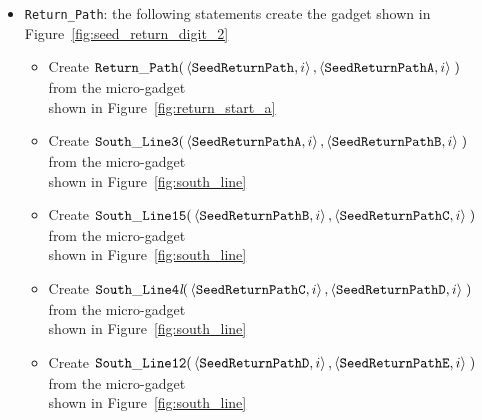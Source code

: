 \begin{itemize}
    \item {\tt Return\_Path}: the following statements create the gadget shown in Figure~\ref{fig:seed_return_digit_2}
    \begin{itemize}
        \item Create
        $\begin{aligned}[t]
            {\tt Return\_Path}(&\left\langle {\tt SeedReturnPath},  i \right\rangle,
                                \left\langle {\tt SeedReturnPathA}, i \right\rangle \;)
        \end{aligned}$ from the micro-gadget\\shown in Figure~\ref{fig:return_start_a}

        \item Create
        $\begin{aligned}[t]
            {\tt South\_Line3}(&\left\langle {\tt SeedReturnPathA}, i \right\rangle,
                                \left\langle {\tt SeedReturnPathB}, i \right\rangle \;)
        \end{aligned}$ from the micro-gadget\\shown in Figure~\ref{fig:south_line}

        \item Create
        $\begin{aligned}[t]
            {\tt South\_Line15}(&\left\langle {\tt SeedReturnPathB}, i \right\rangle,
                                 \left\langle {\tt SeedReturnPathC}, i \right\rangle \;)
        \end{aligned}$ from the micro-gadget\\shown in Figure~\ref{fig:south_line}

        \item Create
        $\begin{aligned}[t]
            {\tt South\_Line4\textit{l}}(&\left\langle {\tt SeedReturnPathC}, i \right\rangle,
                                          \left\langle {\tt SeedReturnPathD}, i \right\rangle \;)
        \end{aligned}$ from the micro-gadget\\shown in Figure~\ref{fig:south_line}

        \item Create
        $\begin{aligned}[t]
            {\tt South\_Line12}(&\left\langle {\tt SeedReturnPathD}, i \right\rangle,
                                 \left\langle {\tt SeedReturnPathE}, i \right\rangle \;)
        \end{aligned}$ from the micro-gadget\\shown in Figure~\ref{fig:south_line}


\end{itemize}
\end{itemize}
